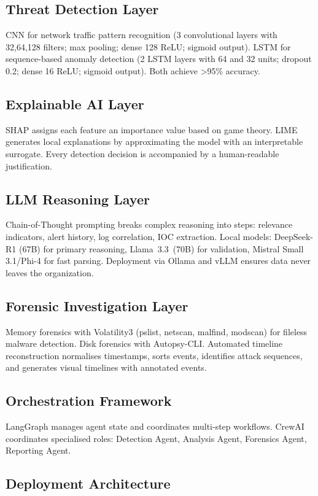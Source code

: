 \documentclass[12pt,a4paper]{report}
\begin{document}
\subsection{Threat Detection Layer}
CNN for network traffic pattern recognition (3 convolutional layers with 32,64,128 filters; max pooling; dense 128 ReLU; sigmoid output). LSTM for sequence-based anomaly detection (2 LSTM layers with 64 and 32 units; dropout 0.2; dense 16 ReLU; sigmoid output). Both achieve >95\% accuracy.

\subsection{Explainable AI Layer}
SHAP assigns each feature an importance value based on game theory. LIME generates local explanations by approximating the model with an interpretable surrogate. Every detection decision is accompanied by a human-readable justification.

\subsection{LLM Reasoning Layer}
Chain-of-Thought prompting breaks complex reasoning into steps: relevance indicators, alert history, log correlation, IOC extraction. Local models: DeepSeek-R1 (67B) for primary reasoning, Llama~3.3~(70B) for validation, Mistral Small 3.1/Phi-4 for fast parsing. Deployment via Ollama and vLLM ensures data never leaves the organization.

\subsection{Forensic Investigation Layer}
Memory forensics with Volatility3 (pslist, netscan, malfind, modscan) for fileless malware detection. Disk forensics with Autopsy-CLI. Automated timeline reconstruction normalises timestamps, sorts events, identifies attack sequences, and generates visual timelines with annotated events.

\subsection{Orchestration Framework}
LangGraph manages agent state and coordinates multi-step workflows. CrewAI coordinates specialised roles: Detection Agent, Analysis Agent, Forensics Agent, Reporting Agent.

\subsection{Deployment Architecture}
\end{document}
